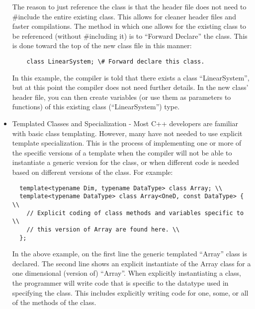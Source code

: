 \begin{itemize}
  The reason to just reference the class is that the header file does
  not need to \#include the entire existing class.  This allows for
  cleaner header files and faster compilations.  The method in which
  one allows for the existing class to be referenced (without
  \#including it) is to ``Forward Declare'' the class.  This is done
  toward the top of the new class file in this manner: \\

\begin{verbatim}
    class LinearSystem; \# Forward declare this class.
\end{verbatim}

  In this example, the compiler is told that there exists a class
  ``LinearSystem'', but at this point the compiler does not need further
  details.  In the new class' header file, you can then create
  variables (or use them as parameters to functions) of this existing
  class (``LinearSystem'') type.
  
\item Templated Classes and Specialization - Most C++ developers are
  familiar with basic class templating.  However, many have not needed
  to use explicit template specialization.  This is the process of
  implementing one or more of the specific versions of a template when
  the compiler will not be able to instantiate a generic version for
  the class, or when different code is needed based on different
  versions of the class.  For example:

\begin{verbatim}
  template<typename Dim, typename DataType> class Array; \\
  template<typename DataType> class Array<OneD, const DataType> { \\
    // Explicit coding of class methods and variables specific to \\
    // this version of Array are found here. \\
  };
\end{verbatim}

  In the above example, on the first line the generic templated
  ``Array'' class is declared.  The second line shows an explicit
  instantiate of the Array class for a one dimensional (version of)
  ``Array''.  When explicitly instantiating a class, the programmer
  will write code that is specific to the datatype used in specifying
  the class.  This includes explicitly writing code for one, some, or
  all of the methods of the class. \\


\end{itemize}
